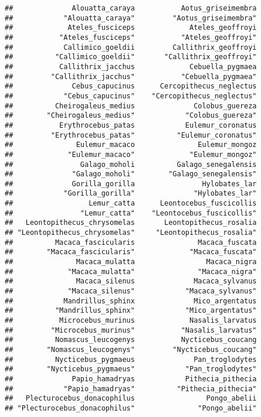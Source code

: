 \documentclass[
]{article}
\begin{document}
\begin{verbatim}
##              Alouatta_caraya           Aotus_griseimembra 
##            "Alouatta_caraya"         "Aotus_griseimembra" 
##             Ateles_fusciceps             Ateles_geoffroyi 
##           "Ateles_fusciceps"           "Ateles_geoffroyi" 
##            Callimico_goeldii         Callithrix_geoffroyi 
##          "Callimico_goeldii"       "Callithrix_geoffroyi" 
##           Callithrix_jacchus             Cebuella_pygmaea 
##         "Callithrix_jacchus"           "Cebuella_pygmaea" 
##              Cebus_capucinus      Cercopithecus_neglectus 
##            "Cebus_capucinus"    "Cercopithecus_neglectus" 
##          Cheirogaleus_medius              Colobus_guereza 
##        "Cheirogaleus_medius"            "Colobus_guereza" 
##           Erythrocebus_patas            Eulemur_coronatus 
##         "Erythrocebus_patas"          "Eulemur_coronatus" 
##               Eulemur_macaco               Eulemur_mongoz 
##             "Eulemur_macaco"             "Eulemur_mongoz" 
##                Galago_moholi          Galago_senegalensis 
##              "Galago_moholi"        "Galago_senegalensis" 
##              Gorilla_gorilla                Hylobates_lar 
##            "Gorilla_gorilla"              "Hylobates_lar" 
##                  Lemur_catta      Leontocebus_fuscicollis 
##                "Lemur_catta"    "Leontocebus_fuscicollis" 
##   Leontopithecus_chrysomelas       Leontopithecus_rosalia 
## "Leontopithecus_chrysomelas"     "Leontopithecus_rosalia" 
##          Macaca_fascicularis               Macaca_fuscata 
##        "Macaca_fascicularis"             "Macaca_fuscata" 
##               Macaca_mulatta                 Macaca_nigra 
##             "Macaca_mulatta"               "Macaca_nigra" 
##               Macaca_silenus              Macaca_sylvanus 
##             "Macaca_silenus"            "Macaca_sylvanus" 
##            Mandrillus_sphinx              Mico_argentatus 
##          "Mandrillus_sphinx"            "Mico_argentatus" 
##           Microcebus_murinus             Nasalis_larvatus 
##         "Microcebus_murinus"           "Nasalis_larvatus" 
##          Nomascus_leucogenys           Nycticebus_coucang 
##        "Nomascus_leucogenys"         "Nycticebus_coucang" 
##          Nycticebus_pygmaeus              Pan_troglodytes 
##        "Nycticebus_pygmaeus"            "Pan_troglodytes" 
##              Papio_hamadryas            Pithecia_pithecia 
##            "Papio_hamadryas"          "Pithecia_pithecia" 
##   Plecturocebus_donacophilus                 Pongo_abelii 
## "Plecturocebus_donacophilus"               "Pongo_abelii" 

\end{verbatim}
\end{document}

